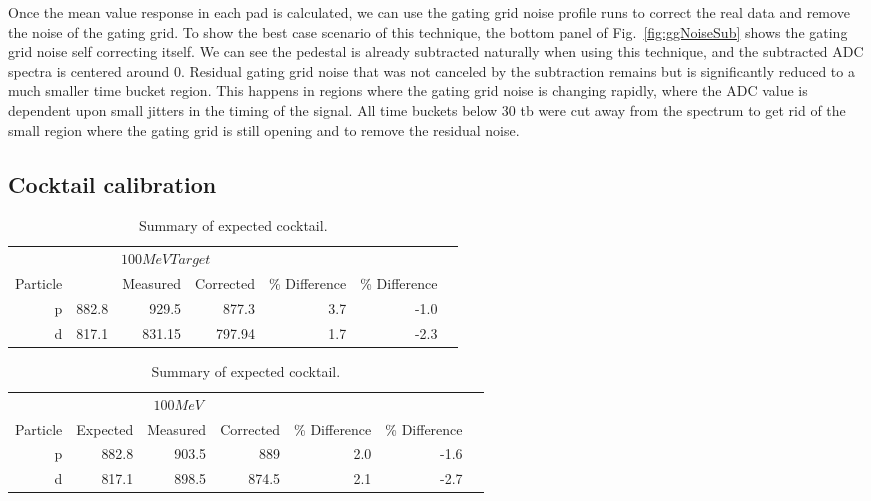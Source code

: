 Once the mean value response in each pad is calculated, we can use the gating grid noise profile runs to correct the real data and remove the noise of the gating grid. To show the best case scenario of this technique, the bottom panel of Fig.~\ref{fig:ggNoiseSub} shows the gating grid noise self correcting itself. We can see the pedestal is already subtracted naturally when using this technique, and the subtracted ADC spectra is centered around 0. Residual gating grid noise that was not canceled by the subtraction remains but is significantly reduced to a much smaller time bucket region. This happens in regions where the gating grid noise is changing rapidly, where the ADC value is dependent upon small jitters in the timing of the signal. All time buckets below 30 tb were cut away from the spectrum to get rid of the small region where the gating grid is still opening and to remove the residual noise. 



\subsection{Cocktail calibration}

\begin{table*}\centering
{}
\begin{tabular}{@{}rrrrrrr@{}}\toprule
& \multicolumn{3}{c}{$100 MeV Target$}\\
\cmidrule{2-4}
Particle &\phantom{abc} & Measured & Corrected & \% Difference & \% Difference\\
\midrule
p   & 882.8 & 929.5 & 877.3   &  3.7  & -1.0  \\
d   & 817.1 & 831.15 & 797.94 &  1.7  & -2.3\\
\bottomrule
\end{tabular}
\caption{Summary of expected cocktail. }
\label{tb:cocktail100tar}
\end{table*}

\begin{table*}\centering
{}
\begin{tabular}{@{}rrrrrrr@{}}\toprule
& \multicolumn{3}{c}{$100 MeV$}\\
\cmidrule{2-4}
Particle & Expected & Measured & Corrected & \% Difference & \% Difference\\
\midrule
p   & 882.8 & 903.5 & 889   &  2.0   & -1.6  \\
d   & 817.1 & 898.5 & 874.5 &  2.1   & -2.7\\
\bottomrule
\end{tabular}
\caption{Summary of expected cocktail. }
\label{tb:cocktail100}
\end{table*}

